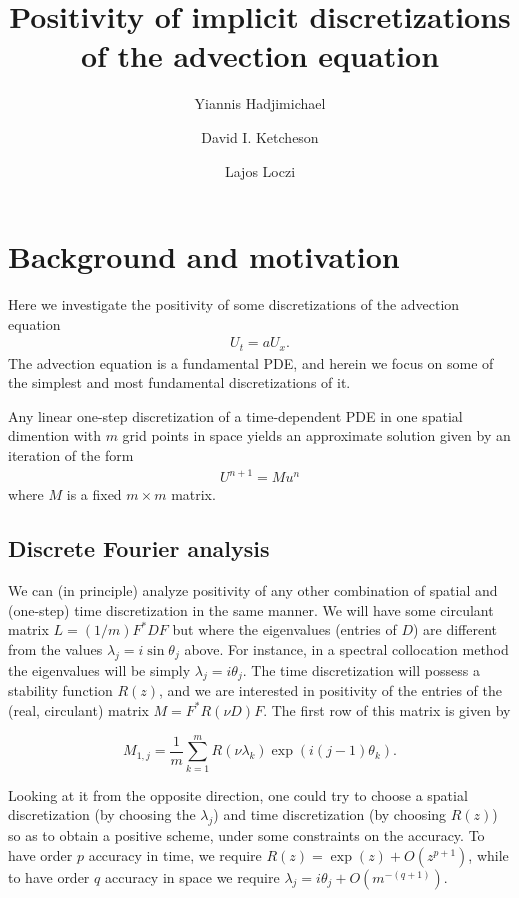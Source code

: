 \documentclass[a4paper]{article}
\title{Positivity of implicit discretizations of the advection equation}
\author{Yiannis Hadjimichael \and David I. Ketcheson \and Lajos Loczi}
\begin{document}
\maketitle

\section{Background and motivation}
Here we investigate the positivity of some discretizations of the advection equation
\begin{align} \label{advection}
U_t = a U_x.
\end{align}
The advection equation is a fundamental PDE, and herein we focus on
some of the simplest and most fundamental discretizations of it.

Any linear one-step discretization of a time-dependent PDE in one spatial
dimention with $m$ grid points in space yields an approximate solution given by
an iteration of the form
\begin{align} \label{M}
    U^{n+1} = Mu^n
\end{align}
where $M$ is a fixed $m\times m$ matrix.


\subsection{Discrete Fourier analysis}
We can (in principle) analyze positivity of any other combination of spatial and (one-step) time discretization in the same manner.  We
will have some circulant matrix $L = (1/m) F^* D F$ but where
the eigenvalues (entries of $D$) are different from the values
$\lambda_j = i\sin \theta_j$ above.  For instance, in a spectral collocation
method the eigenvalues will be simply $\lambda_j = i \theta_j$.  The time
discretization will possess a stability function $R(z)$, and
we are interested in positivity of the entries of the (real, circulant)
matrix $M=F^* R(\nu D) F$.  The first row of this matrix is given by

$$M_{1,j} = \frac{1}{m} \sum_{k=1}^m R(\nu\lambda_k) \exp(i(j-1)\theta_k).$$

Looking at it from the opposite direction, one could try to choose a spatial
discretization (by choosing the $\lambda_j$) and time discretization
(by choosing $R(z)$) so as to obtain a positive scheme, under some constraints on the accuracy.  To have order $p$ accuracy in time,
we require $R(z) = \exp(z) + O(z^{p+1})$, while to have order $q$
accuracy in space we require $\lambda_j = i \theta_j + O(m^{-(q+1)}).$
\end{document}
